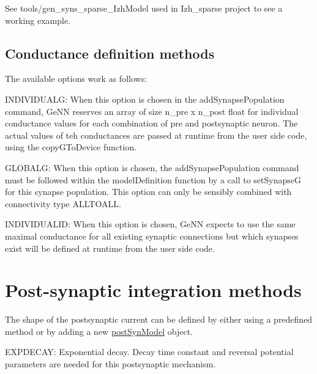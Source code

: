 See tools/gen\+\_\+syns\+\_\+sparse\+\_\+\+Izh\+Model used in Izh\+\_\+sparse project to see a working example.\hypertarget{Manual_subsect33}{}\subsection{Conductance definition methods}\label{Manual_subsect33}
The available options work as follows\+:
\begin{DoxyItemize}
\item I\+N\+D\+I\+V\+I\+D\+U\+A\+L\+G\+: When this option is chosen in the {\ttfamily add\+Synapse\+Population} command, Ge\+N\+N reserves an array of size n\+\_\+pre x n\+\_\+post float for individual conductance values for each combination of pre and postsynaptic neuron. The actual values of teh conductances are passed at runtime from the user side code, using the {\ttfamily copy\+G\+To\+Device} function.
\item G\+L\+O\+B\+A\+L\+G\+: When this option is chosen, the {\ttfamily add\+Synapse\+Population} command must be followed within the {\ttfamily model\+Definition} function by a call to {\ttfamily set\+Synapse\+G} for this synapse population. This option can only be sensibly combined with connectivity type A\+L\+L\+T\+O\+A\+L\+L.
\item I\+N\+D\+I\+V\+I\+D\+U\+A\+L\+I\+D\+: When this option is chosen, Ge\+N\+N expects to use the same maximal conductance for all existing synaptic connections but which synapses exist will be defined at runtime from the user side code. 
\end{DoxyItemize}\hypertarget{Manual_sect_postsyn}{}\section{Post-\/synaptic integration methods}\label{Manual_sect_postsyn}
The shape of the postsynaptic current can be defined by either using a predefined method or by adding a new \hyperlink{structpostSynModel}{post\+Syn\+Model} object.


\begin{DoxyItemize}
\item E\+X\+P\+D\+E\+C\+A\+Y\+: Exponential decay. Decay time constant and reversal potential parameters are needed for this postsynaptic mechanism. 
\end{DoxyItemize}